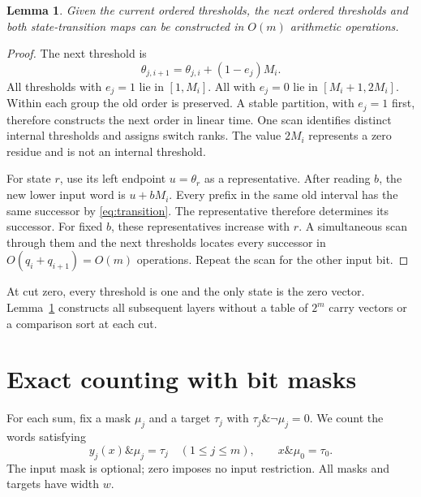 \documentclass[11pt,a4paper]{article}
\newtheorem{lemma}[theorem]{Lemma}
\newcommand{\andb}{\mathbin{\&}}
\begin{document}
\begin{lemma}\label{lem:stable}
Given the current ordered thresholds, the next ordered thresholds and both
state-transition maps can be constructed in $O(m)$ arithmetic operations.
\end{lemma}
\begin{proof}
The next threshold is
\begin{equation}\label{eq:threshold-update}
 \theta_{j,i+1}=\theta_{j,i}+(1-e_j)M_i.
\end{equation}
All thresholds with $e_j=1$ lie in $[1,M_i]$.
All with $e_j=0$ lie in $[M_i+1,2M_i]$.
Within each group the old order is preserved. A stable partition, with
$e_j=1$ first, therefore constructs the next order in linear time.
One scan identifies distinct internal thresholds and assigns switch ranks.
The value $2M_i$ represents a zero residue and is not an internal threshold.

For state $r$, use its left endpoint $u=\theta_r$ as a representative.
After reading $b$, the new lower input word is $u+bM_i$.
Every prefix in the same old interval has the same successor by
\eqref{eq:transition}. The representative therefore determines its successor.
For fixed $b$, these representatives increase with $r$.
A simultaneous scan through them and the next thresholds locates every
successor in $O(q_i+q_{i+1})=O(m)$ operations.
Repeat the scan for the other input bit.
\end{proof}

At cut zero, every threshold is one and the only state is the zero vector.
Lemma~\ref{lem:stable} constructs all subsequent layers without a table of
$2^m$ carry vectors or a comparison sort at each cut.

\section{Exact counting with bit masks}
For each sum, fix a mask $\mu_j$ and a target $\tau_j$ with
$\tau_j\andb\neg\mu_j=0$. We count the words satisfying
\begin{equation}\label{eq:masks}
 y_j(x)\andb\mu_j=\tau_j\quad(1\leq j\leq m),\qquad
 x\andb\mu_0=\tau_0.
\end{equation}
The input mask is optional; zero imposes no input restriction.
All masks and targets have width $w$.
\end{document}
